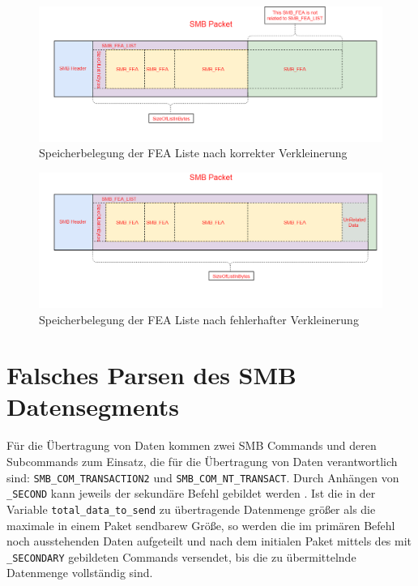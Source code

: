 \documentclass[DIV=12,headings=normal,pdftex,headinclude=false,footinclude=false,final]{scrreprt}
\begin{document}
\begin{figure}[H]
    \centering
    \includegraphics[width=15cm]{checkpoint_after_shrink_correct.png}
    \caption[FEAList nach korrekter Verkleinerung, Nadav Grossmann (Checkpoint Research), URL: \url{https://research.checkpoint.com/wp-content/uploads/2017/09/eternalblue5.png}]{Speicherbelegung der FEA Liste nach korrekter Verkleinerung}
    \label{img:fealist_after_shrinking_correctly}
\end{figure}

\begin{figure}[H]
    \centering
    \includegraphics[width=15cm]{checkpoint_after_shrink_error.png}
    \caption[FEAList nach fehlerhafter Verkleinerung, Nadav Grossmann (Checkpoint Research), URL: \url{https://research.checkpoint.com/wp-content/uploads/2017/09/eternalblue6.png}]{Speicherbelegung der FEA Liste nach fehlerhafter Verkleinerung}
    \label{img:fealist_after_shrinking_incorrectly}
\end{figure}

\section{Falsches Parsen des SMB Datensegments}\label{sec:Wrong_Parse}
Für die Übertragung von Daten kommen zwei SMB Commands und deren Subcommands zum Einsatz, die für die Übertragung von Daten verantwortlich sind: \verb|SMB_COM_TRANSACTION2| und \verb|SMB_COM_NT_TRANSACT|. Durch Anhängen von \verb|_SECOND| kann jeweils der sekundäre Befehl gebildet werden \cite{MS:SMBCom}. Ist die in der Variable \verb|total_data_to_send| zu übertragende Datenmenge größer als die maximale in einem Paket sendbarew Größe, so werden die im primären Befehl noch ausstehenden Daten aufgeteilt und nach dem initialen Paket mittels des mit \verb|_SECONDARY| gebildeten Commands versendet, bis die zu übermittelnde Datenmenge vollständig sind\cite{TM:EB}.
\end{document}
